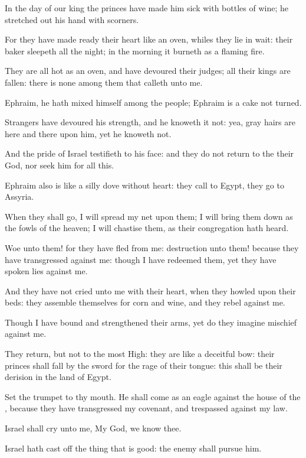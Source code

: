 \Verse In the day of our king the princes have made him sick with bottles of wine; he stretched out his hand with scorners.

\Verse For they have made ready their heart like an oven, whiles they lie in wait: their baker sleepeth all the night; in the morning it burneth as a flaming fire.

\Verse They are all hot as an oven, and have devoured their judges; all their kings are fallen: there is none among them that calleth unto me.

\Verse Ephraim, he hath mixed himself among the people; Ephraim is a cake not turned.

\Verse Strangers have devoured his strength, and he knoweth it not: yea, gray hairs are here and there upon him, yet he knoweth not.

\Verse And the pride of Israel testifieth to his face: and they do not return to the \LORD their God, nor seek him for all this.

\Verse Ephraim also is like a silly dove without heart: they call to Egypt, they go to Assyria.

\Verse When they shall go, I will spread my net upon them; I will bring them down as the fowls of the heaven; I will chastise them, as their congregation hath heard.

\Verse Woe unto them! for they have fled from me: destruction unto them!  because they have transgressed against me: though I have redeemed them, yet they have spoken lies against me.

\Verse And they have not cried unto me with their heart, when they howled upon their beds: they assemble themselves for corn and wine, and they rebel against me.

\Verse Though I have bound and strengthened their arms, yet do they imagine mischief against me.

\Verse They return, but not to the most High: they are like a deceitful bow: their princes shall fall by the sword for the rage of their tongue: this shall be their derision in the land of Egypt.


\Chapter
\Verse Set the trumpet to thy mouth. He shall come as an eagle against the house of the \LORD, because they have transgressed my covenant, and trespassed against my law.

\Verse Israel shall cry unto me, My God, we know thee.

\Verse Israel hath cast off the thing that is good: the enemy shall pursue him.

